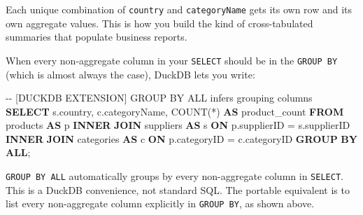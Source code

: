 \documentclass[
  letterpaper,
  DIV=11,
  numbers=noendperiod]{scrreprt}
\newenvironment{Shaded}{\begin{snugshade}}{\end{snugshade}}
\newcommand{\CommentTok}[1]{\textcolor[rgb]{0.37,0.37,0.37}{#1}}
\newcommand{\FunctionTok}[1]{\textcolor[rgb]{0.28,0.35,0.67}{#1}}
\newcommand{\KeywordTok}[1]{\textcolor[rgb]{0.00,0.23,0.31}{\textbf{#1}}}
\newcommand{\NormalTok}[1]{\textcolor[rgb]{0.00,0.23,0.31}{#1}}
\newcommand{\OperatorTok}[1]{\textcolor[rgb]{0.37,0.37,0.37}{#1}}
\begin{document}
Each unique combination of \texttt{country} and \texttt{categoryName}
gets its own row and its own aggregate values. This is how you build the
kind of cross-tabulated summaries that populate business reports.

\begin{tcolorbox}[enhanced jigsaw, opacitybacktitle=0.6, arc=.35mm, colback=white, bottomtitle=1mm, opacityback=0, toprule=.15mm, left=2mm, colbacktitle=quarto-callout-tip-color!10!white, breakable, coltitle=black, toptitle=1mm, colframe=quarto-callout-tip-color-frame, bottomrule=.15mm, titlerule=0mm, title=\textcolor{quarto-callout-tip-color}{\faLightbulb}\hspace{0.5em}{DuckDB's GROUP BY ALL}, rightrule=.15mm, leftrule=.75mm]

When every non-aggregate column in your \texttt{SELECT} should be in the
\texttt{GROUP\ BY} (which is almost always the case), DuckDB lets you
write:

\begin{codelisting}[H]

\caption{\texttt{duckdb}}

\begin{Shaded}
\begin{Highlighting}[]
\CommentTok{{-}{-} [DUCKDB EXTENSION] GROUP BY ALL infers grouping columns}
\KeywordTok{SELECT}
\NormalTok{    s.country,}
\NormalTok{    c.categoryName,}
    \FunctionTok{COUNT}\NormalTok{(}\OperatorTok{*}\NormalTok{) }\KeywordTok{AS}\NormalTok{ product\_count}
\KeywordTok{FROM}\NormalTok{ products }\KeywordTok{AS}\NormalTok{ p}
\KeywordTok{INNER} \KeywordTok{JOIN}\NormalTok{ suppliers }\KeywordTok{AS}\NormalTok{ s }\KeywordTok{ON}\NormalTok{ p.supplierID }\OperatorTok{=}\NormalTok{ s.supplierID}
\KeywordTok{INNER} \KeywordTok{JOIN}\NormalTok{ categories }\KeywordTok{AS}\NormalTok{ c }\KeywordTok{ON}\NormalTok{ p.categoryID }\OperatorTok{=}\NormalTok{ c.categoryID}
\KeywordTok{GROUP} \KeywordTok{BY} \KeywordTok{ALL}\NormalTok{;}
\end{Highlighting}
\end{Shaded}

\end{codelisting}

\texttt{GROUP\ BY\ ALL} automatically groups by every non-aggregate
column in \texttt{SELECT}. This is a DuckDB convenience, not standard
SQL. The portable equivalent is to list every non-aggregate column
explicitly in \texttt{GROUP\ BY}, as shown above.

\end{tcolorbox}
\end{document}

